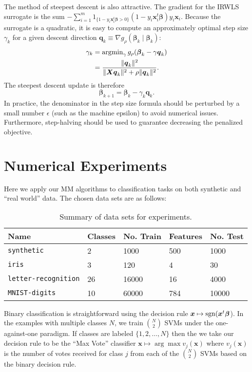 \documentclass[11pt]{article}
\def\sgn{\mathop{\rm sgn}\nolimits}
\def\argmin{\mathop{\rm argmin}\nolimits}
\newcommand{\bq}{\boldsymbol{q}}
\newcommand{\bx}{\boldsymbol{x}}
\newcommand{\bX}{\boldsymbol{X}}
\newcommand{\bbeta}{\boldsymbol{\beta}}
\begin{document}
The method of steepest descent is also attractive.
The gradient for the IRWLS surrogate is the sum $-\sum_{i=1}^m 1_{\{1-y_i\bx_i^t\bbeta > 0\}}(1-y_i\bx_i^t\bbeta)y_i\bx_i$.
Because the surrogate is a quadratic, it is easy to compute an approximately optimal step size $\gamma_{k}$ for a given descent direction $\bq_{k} \equiv \nabla g_{\rho}(\bbeta_{k} \mid \bbeta_{k})$:
\begin{align*}
    \gamma_{k} &= \argmin_{\gamma} g_{\rho}(\bbeta_{k} - \gamma \bq_{k}) \\
    &= \frac{\|\bq_{k}\|^{2}}{\|\bX \bq_{k}\|^{2} + \rho \|\bq_{k}\|^{2}}.
\end{align*}
The steepest descent update is therefore
\[
    \bbeta_{k+1} = \bbeta_{k} - \gamma_{k} \bq_{k}.
\]
In practice, the denominator in the step size formula should be perturbed by a small number $\epsilon$ (such as the machine epsilon) to avoid numerical issues.
Furthermore, step-halving should be used to guarantee decreasing the penalized objective.

\section*{\center Numerical Experiments}

Here we apply our MM algorithms to classification tasks on both synthetic and ``real world'' data.
The chosen data sets are as follows:
\begin{table}[!h]
    \centering
    \begin{tabular}{lllll}
        \toprule
        Name & Classes & No. Train & Features & No. Test \\
        \midrule
        \texttt{synthetic} & 2 & 1000 & 500 & 1000 \\
        \texttt{iris} & 3 & 120 & 4 & 30 \\
        \texttt{letter-recognition} & 26 & 16000 & 16 & 4000 \\
        \texttt{MNIST-digits} & 10 & 60000 & 784 & 10000 \\
        \bottomrule
    \end{tabular}
    \caption{Summary of data sets for experiments.}
\end{table}
Binary classification is straightforward using the decision rule $\bx \mapsto \sgn (\bx^t \bbeta$).
In the examples with multiple classes $N$, we train $\binom{N}{2}$ SVMs under the one-against-one paradigm.
If classes are labeled $\{1, 2, \ldots, N\}$ then the we take our decision rule to be the ``Max Vote'' classifier $\bx \mapsto \arg\max v_{j}(\bx)$ where $v_{j}(\bx)$ is the number of votes received for class $j$ from each of the $\binom{N}{2}$ SVMs based on the binary decision rule.
\end{document}
